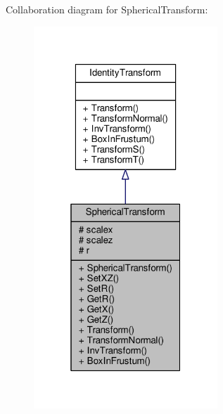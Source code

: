 Collaboration diagram for Spherical\+Transform\+:
\nopagebreak
\begin{figure}[H]
\begin{center}
\leavevmode
\includegraphics[width=196pt]{d7/d57/classSphericalTransform__coll__graph}
\end{center}
\end{figure}

